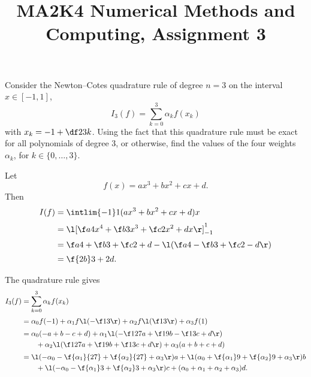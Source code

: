 \documentclass[a4paper]{article}
\title{MA2K4 Numerical Methods and Computing, Assignment 3}
\begin{document}
\maketitle

\setlength{\parindent}{0em}
\setlength{\parskip}{1em}







\begin{questionbody}
Consider the Newton--Cotes quadrature rule of degree $n = 3$ on the interval $x \in [-1, 1]$, \[ %
I_3(f) = \sum_{k=0}^3 \alpha_k f(x_k)
\] with $x_k = -1 + \df23 k$. Using the fact that this quadrature rule must be exact for all polynomials of degree 3, or otherwise, find the values of the four weights $\alpha_k$, for $k \in \{0, \dotsc, 3\}$.
\end{questionbody}

Let \[
f(x) = a x^3 + b x^2 + c x + d.
\] Then
\begin{align*}
I(f) &= \intlim {-1}1 {(a x^3 + b x^2 + c x + d)} x \\[0.5ex]
&= {\l[ \f a4 x^4 + \f b3 x^3 + \f c2 x^2 + dx \r]}_{-1}^1 \\[0.5ex]
&= \f a4 + \f b3 + \f c2 + d - \l( \f a4 - \f b3 + \f c2 - d \r) \\[0.5ex]
&= \f{2b}3 + 2d.
\end{align*}

The quadrature rule gives
\begin{align*}
I_3(f) &= \sum_{k=0}^3 \alpha_k f(x_k) \\[0.5ex]
&= \alpha_0 f(-1) + \alpha_1 f \l( -\f13 \r) + \alpha_2 f \l( \f13 \r) + \alpha_3 f(1) \\[0.5ex]
&= \alpha_0 (-a + b - c + d)
    + \alpha_1 \l( -\f1{27} a + \f19 b - \f13 c + d \r) \\
    &\qquad + \alpha_2 \l( \f1{27} a + \f19 b + \f13 c + d \r)
    + \alpha_3 (a + b + c + d) \\[0.5ex]
&= \l( -\alpha_0 - \f{\alpha_1}{27} + \f{\alpha_2}{27} + \alpha_3 \r) a
    + \l( \alpha_0 + \f{\alpha_1}9 + \f{\alpha_2}9 + \alpha_3 \r) b \\
    &\qquad + \l( -\alpha_0 - \f{\alpha_1}3 + \f{\alpha_2}3 + \alpha_3 \r) c
    + (\alpha_0 + \alpha_1 + \alpha_2 + \alpha_3) d.
\end{align*}
\end{document}
